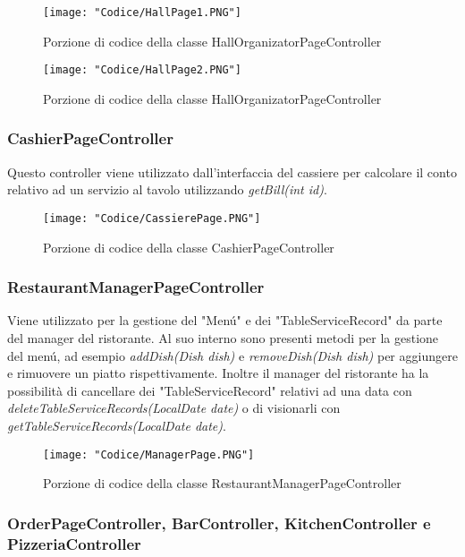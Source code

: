\documentclass{article}
\begin{document}
\begin{figure}[!h]
\centering
\texttt{[image: "Codice/HallPage1.PNG"]}
\caption{Porzione di codice della classe HallOrganizatorPageController}
\end{figure}

\begin{figure}[!h]
\centering
\texttt{[image: "Codice/HallPage2.PNG"]}
\caption{Porzione di codice della classe HallOrganizatorPageController}
\end{figure}

\newpage

\subsubsection{CashierPageController}

Questo controller viene utilizzato dall'interfaccia del cassiere per calcolare il conto relativo ad un servizio al tavolo utilizzando \textit{getBill(int id)}.

\begin{figure}[!h]
\centering
\texttt{[image: "Codice/CassierePage.PNG"]}
\caption{Porzione di codice della classe CashierPageController}
\end{figure}

\newpage

\subsubsection{RestaurantManagerPageController}

Viene utilizzato per la gestione del "Men\'u" e dei "TableServiceRecord" da parte del manager del ristorante. Al suo interno sono presenti metodi per la gestione del men\'u, ad esempio \textit{addDish(Dish dish)} e \textit{removeDish(Dish dish)} per aggiungere e rimuovere un piatto rispettivamente. Inoltre il manager del ristorante ha la possibilità di cancellare dei "TableServiceRecord" relativi ad una data con \textit{deleteTableServiceRecords(LocalDate date)} o di visionarli con \textit{getTableServiceRecords(LocalDate date)}.

\begin{figure}[!h]
\centering
\texttt{[image: "Codice/ManagerPage.PNG"]}
\caption{Porzione di codice della classe RestaurantManagerPageController}
\end{figure}

\newpage


\subsubsection{OrderPageController, BarController, KitchenController e PizzeriaController}
\end{document}
